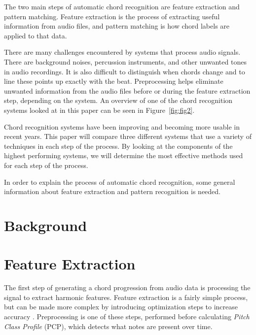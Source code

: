 \documentclass{sig-alternate}
\begin{document}
The two main steps of automatic chord recognition are feature extraction and pattern matching. Feature extraction is the process of extracting useful information from audio files, and pattern matching is how chord labels are applied to that data. 

There are many challenges encountered by systems that process audio signals. There are background noises, percussion instruments, and other unwanted tones in audio recordings. It is also difficult to distinguish when chords change and to line these points up exactly with the beat. Preprocessing helps eliminate unwanted information from the audio files before or during the feature extraction step, depending on the system. An overview of one of the chord recognition systems looked at in this paper can be seen in Figure~\ref{fig:fig2}.

Chord recognition systems have been improving and becoming more usable in recent years. This paper will compare three different systems that use a variety of techniques in each step of the process. By looking at the components of the highest performing systems, we will determine the most effective methods used for each step of the process. 

In order to explain the process of automatic chord recognition, some general information about feature extraction and pattern recognition is needed. 

\begin{figure*}
\centering
{}
\caption{Overview of the chord recognition system used in~\cite{Morman:2006}.}
\label{fig:fig2}
\end{figure*}  

\section{Background}

\section{Feature Extraction}

The first step of generating a chord progression from audio data is processing the signal to extract harmonic features. Feature extraction is a fairly simple process, but can be made more complex by introducing optimization steps to increase accuracy \cite{McVicar:2014}. Preprocessing is one of these steps, performed before calculating \textit{Pitch Class Profile} (PCP), which detects what notes are present over time.
\end{document}
